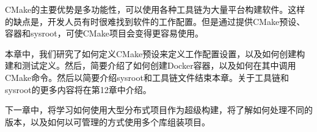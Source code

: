 CMake的主要优势是多功能性，可以使用各种工具链为大量平台构建软件。这样的缺点是，开发人员有时很难找到软件的工作配置。但是通过提供CMake预设、容器和sysroot，可使CMake项目会变得更容易使用。

本章中，我们研究了如何定义CMake预设来定义工作配置设置，以及如何创建构建和测试定义。然后，简要介绍了如何创建Docker容器，以及如何在其中调用CMake命令。然后以简要介绍sysroot和工具链文件结束本章。关于工具链和sysroot的更多内容将在第12章中介绍。

下一章中，将学习如何使用大型分布式项目作为超级构建，将了解如何处理不同的版本，以及如何以可管理的方式使用多个库组装项目。